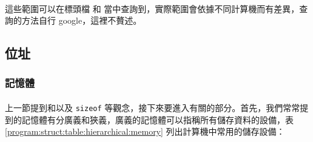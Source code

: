 \documentclass[12pt,a4paper,oneside]{report}
\begin{document}
\begin{CJK}{UTF8}{bkai}
\paragraph{}這些範圍可以在標頭檔  和  當中查詢到，實際範圍會依據不同計算機而有差異，查詢的方法自行 google，這裡不贅述。

\subsection{位址}

\subsubsection{記憶體}

\paragraph{}上一節提到和以及 \lstinline!sizeof! 等觀念，接下來要進入有關的部分。首先，我們常常提到的記憶體有分廣義和狹義，廣義的記憶體可以指稱所有儲存資料的設備，表 \ref{program:struct:table:hierarchical:memory} 列出計算機中常用的儲存設備：


\end{CJK}
\end{document}
